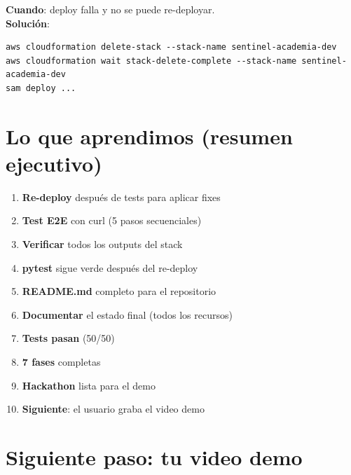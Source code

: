 \documentclass[11pt,a4paper,oneside]{article}
\begin{document}
\begin{tcolorbox}[colback=errred!5!white,colframe=errred,breakable,title={Error 4: Stack en ROLLBACK\_COMPLETE}]
\textbf{Cuando}: deploy falla y no se puede re-deployar. \\
\textbf{Soluci\'on}:
\begin{lstlisting}
aws cloudformation delete-stack --stack-name sentinel-academia-dev
aws cloudformation wait stack-delete-complete --stack-name sentinel-academia-dev
sam deploy ...
\end{lstlisting}
\end{tcolorbox}

\section{Lo que aprendimos (resumen ejecutivo)}

\begin{tcolorbox}[colback=okgreen!5!white,colframe=okgreen,title={\textbf{Checklist Fase 7}}]
\begin{enumerate}
  \item \textbf{Re-deploy} despu\'es de tests para aplicar fixes
  \item \textbf{Test E2E} con curl (5 pasos secuenciales)
  \item \textbf{Verificar} todos los outputs del stack
  \item \textbf{pytest} sigue verde despu\'es del re-deploy
  \item \textbf{README.md} completo para el repositorio
  \item \textbf{Documentar} el estado final (todos los recursos)
  \item \textbf{Tests pasan} (50/50)
  \item \textbf{7 fases} completas
  \item \textbf{Hackathon} lista para el demo
  \item \textbf{Siguiente}: el usuario graba el video demo
\end{enumerate}
\end{tcolorbox}

\section{Siguiente paso: tu video demo}
\end{document}
